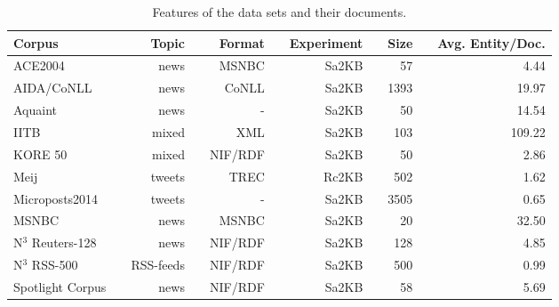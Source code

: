 \begin{table}
    \caption{Features of the data sets and their documents.}
    \begin{tabular}{lp{0.25cm}rp{0.25cm}rp{0.25cm}rp{0.25cm}rp{0.25cm}r}
     \toprule
     Corpus && Topic &&Format &&Experiment && \multicolumn{1}{c}{Size} && \multicolumn{1}{c}{Avg. Entity/Doc.} \\
    \midrule
ACE2004          && news        && MSNBC    && Sa2KB    &&   57 &&   4.44\\
AIDA/CoNLL       && news        && CoNLL    && Sa2KB    && 1393 &&  19.97\\
Aquaint          && news        &&  -       && Sa2KB    &&   50 &&  14.54\\
IITB             && mixed       && XML      && Sa2KB    &&  103 && 109.22\\
KORE 50          && mixed       && NIF/RDF  && Sa2KB    &&   50 &&   2.86\\
Meij             && tweets      && TREC     && Rc2KB    &&  502 &&   1.62\\
Microposts2014   && tweets      &&  -       && Sa2KB    && 3505 &&   0.65\\
MSNBC            && news        && MSNBC    && Sa2KB    &&   20 &&  32.50\\
N$^3$ Reuters-128&& news        && NIF/RDF  && Sa2KB    &&  128 &&   4.85\\
N$^3$ RSS-500    && RSS-feeds   && NIF/RDF  && Sa2KB    &&  500 &&   0.99\\
Spotlight Corpus && news        && NIF/RDF  && Sa2KB    &&   58 &&   5.69\\
	\bottomrule
	\end{tabular}
	\centering
	\label{tab:corpus_stats}
\end{table}


